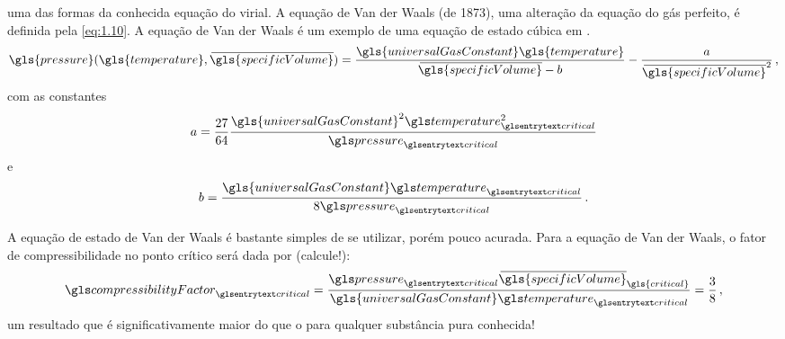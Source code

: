     \noindent uma das formas da conhecida equação do virial. A equação de Van
    der Waals (de 1873), uma alteração da equação do gás perfeito, é definida
    pela \cref{eq:1.10}. A equação de Van der Waals é um exemplo de uma equação
    de estado cúbica em .
	\begin{equation} \label{eq:1.10}
        \gls{pressure}
        \functionOf{
            \gls{temperature},
            \molar{\gls{specificVolume}}
        }
        =
        \frac{
            \gls{universalGasConstant}
            \gls{temperature}
        }{
            \molar{\gls{specificVolume}}
            -
            b
        }
        -
        \frac{
            a
        }{
            \molar{\gls{specificVolume}}^2
        }\,,
    \end{equation}
    com as constantes
    \begin{equation} \label{eq:1.11}
        a
        =
        \frac{27}{64}
        \frac{
            \gls{universalGasConstant}^2
            \gsub{temperature}{critical}^2
        }{
            \gsub{pressure}{critical}
        }
    \end{equation}
    e
    \begin{equation} \label{eq:1.12}
        b
        =
        \frac{
            \gls{universalGasConstant}
            \gsub{temperature}{critical}
        }{
            8\gsub{pressure}{critical}
        }\,.
    \end{equation}

    A equação de estado de Van der Waals é bastante simples de se utilizar,
    porém pouco acurada. Para a equação de Van der Waals, o fator de
    compressibilidade no ponto crítico 
    será dada por (calcule!):
    \begin{equation} \label{eq:1.13}
        \gsub{compressibilityFactor}{critical}
        =
        \frac{
            \gsub{pressure}{critical}
            \molar{\gls{specificVolume}}_{\gls{critical}}
        }{
            \gls{universalGasConstant}
            \gsub{temperature}{critical}
        }
        =
        \frac{3}{8}\,,
    \end{equation}
%
    um resultado que é significativamente maior do que o
     para qualquer substância pura
    conhecida!

